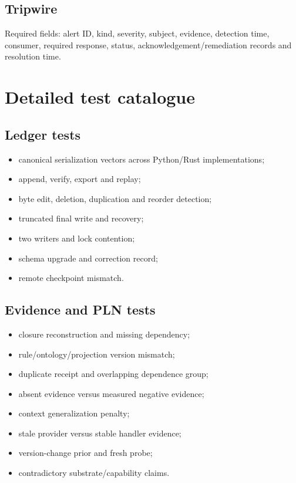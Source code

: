 \documentclass[11pt,oneside]{report}
\begin{document}
\section{Tripwire}
Required fields: alert ID, kind, severity, subject, evidence, detection time, consumer, required response, status, acknowledgement/remediation records and resolution time.

\chapter{Detailed test catalogue}

\section{Ledger tests}

\begin{itemize}
  \item canonical serialization vectors across Python/Rust implementations;
  \item append, verify, export and replay;
  \item byte edit, deletion, duplication and reorder detection;
  \item truncated final write and recovery;
  \item two writers and lock contention;
  \item schema upgrade and correction record;
  \item remote checkpoint mismatch.
\end{itemize}

\section{Evidence and PLN tests}

\begin{itemize}
  \item closure reconstruction and missing dependency;
  \item rule/ontology/projection version mismatch;
  \item duplicate receipt and overlapping dependence group;
  \item absent evidence versus measured negative evidence;
  \item context generalization penalty;
  \item stale provider versus stable handler evidence;
  \item version-change prior and fresh probe;
  \item contradictory substrate/capability claims.
\end{itemize}
\end{document}
